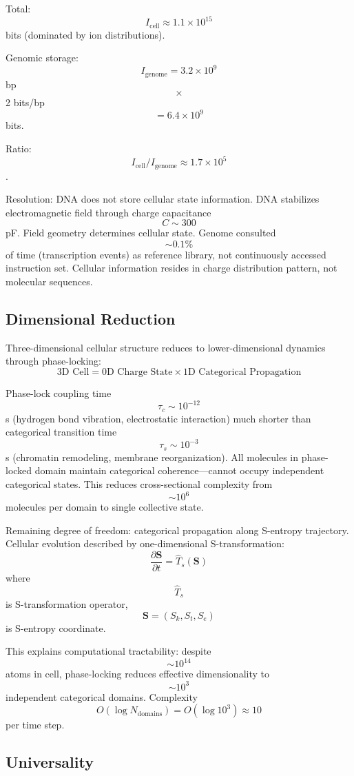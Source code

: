 \documentclass[11pt,twocolumn,a4paper]{article}
\theoremstyle{remark}
\begin{document}
Total: $$I_{\mathrm{cell}} \approx 1.1 \times 10^{15}$$ bits (dominated by ion distributions).

Genomic storage: $$I_{\mathrm{genome}} = 3.2 \times 10^9$$ bp $$\times$$ 2 bits/bp $$= 6.4 \times 10^9$$ bits.

Ratio: $$I_{\mathrm{cell}}/I_{\mathrm{genome}} \approx 1.7 \times 10^5$$.

Resolution: DNA does not store cellular state information. DNA stabilizes electromagnetic field through charge capacitance $$C \sim 300$$ pF. Field geometry determines cellular state. Genome consulted $$\sim 0.1\%$$ of time (transcription events) as reference library, not continuously accessed instruction set. Cellular information resides in charge distribution pattern, not molecular sequences.

\subsection{Dimensional Reduction}

Three-dimensional cellular structure reduces to lower-dimensional dynamics through phase-locking:
$$
\text{3D Cell} = \text{0D Charge State} \times \text{1D Categorical Propagation}
$$

Phase-lock coupling time $$\tau_c \sim 10^{-12}$$ s (hydrogen bond vibration, electrostatic interaction) much shorter than categorical transition time $$\tau_s \sim 10^{-3}$$ s (chromatin remodeling, membrane reorganization). All molecules in phase-locked domain maintain categorical coherence---cannot occupy independent categorical states. This reduces cross-sectional complexity from $$\sim 10^6$$ molecules per domain to single collective state.

Remaining degree of freedom: categorical propagation along S-entropy trajectory. Cellular evolution described by one-dimensional S-transformation:
$$
\frac{\partial \mathbf{S}}{\partial t} = \hat{T}_s(\mathbf{S})
$$
where $$\hat{T}_s$$ is S-transformation operator, $$\mathbf{S} = (S_k, S_t, S_e)$$ is S-entropy coordinate.

This explains computational tractability: despite $$\sim 10^{14}$$ atoms in cell, phase-locking reduces effective dimensionality to $$\sim 10^3$$ independent categorical domains. Complexity $$O(\log N_{\mathrm{domains}}) = O(\log 10^3) \approx 10$$ per time step.

\subsection{Universality}
\end{document}
